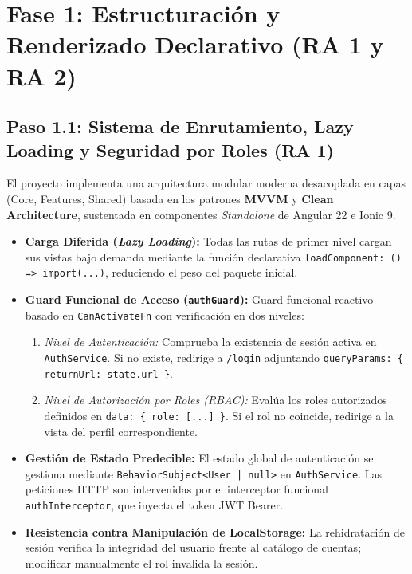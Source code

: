 \documentclass[11pt,a4paper]{article}
\begin{document}
\section{Fase 1: Estructuración y Renderizado Declarativo (RA 1 y RA 2)}
\label{sec:fase1}

\subsection{Paso 1.1: Sistema de Enrutamiento, Lazy Loading y Seguridad por Roles (RA 1)}
El proyecto implementa una arquitectura modular moderna desacoplada en capas (Core, Features, Shared) basada en los patrones \textbf{MVVM} y \textbf{Clean Architecture}, sustentada en componentes \textit{Standalone} de Angular 22 e Ionic 9.

\begin{itemize}[leftmargin=*]
    \item \textbf{Carga Diferida (\textit{Lazy Loading}):} Todas las rutas de primer nivel cargan sus vistas bajo demanda mediante la función declarativa \texttt{loadComponent: () => import(...)}, reduciendo el peso del paquete inicial.
    \item \textbf{Guard Funcional de Acceso (\texttt{authGuard}):} Guard funcional reactivo basado en \texttt{CanActivateFn} con verificación en dos niveles:
          \begin{enumerate}
              \item \textit{Nivel de Autenticación:} Comprueba la existencia de sesión activa en \texttt{AuthService}. Si no existe, redirige a \texttt{/login} adjuntando \texttt{queryParams: \{ returnUrl: state.url \}}.
              \item \textit{Nivel de Autorización por Roles (RBAC):} Evalúa los roles autorizados definidos en \texttt{data: \{ role: [...] \}}. Si el rol no coincide, redirige a la vista del perfil correspondiente.
          \end{enumerate}
    \item \textbf{Gestión de Estado Predecible:} El estado global de autenticación se gestiona mediante \texttt{BehaviorSubject<User | null>} en \texttt{AuthService}. Las peticiones HTTP son intervenidas por el interceptor funcional \texttt{authInterceptor}, que inyecta el token JWT Bearer.
    \item \textbf{Resistencia contra Manipulación de LocalStorage:} La rehidratación de sesión verifica la integridad del usuario frente al catálogo de cuentas; modificar manualmente el rol invalida la sesión.
\end{itemize}
\end{document}
